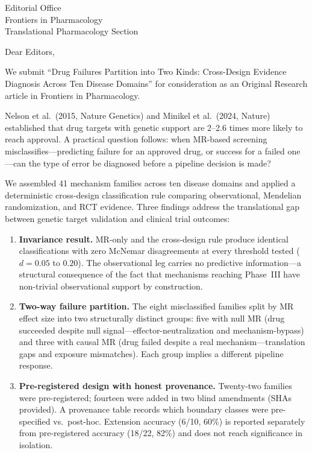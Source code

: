 \documentclass[11pt]{letter}
\date{\today}
\begin{document}
\begin{letter}{Editorial Office \\ Frontiers in Pharmacology \\ Translational Pharmacology Section}

\opening{Dear Editors,}

We submit ``Drug Failures Partition into Two Kinds: Cross-Design Evidence Diagnosis Across Ten Disease Domains'' for consideration as an Original Research article in Frontiers in Pharmacology.

Nelson et al.\ (2015, Nature Genetics) and Minikel et al.\ (2024, Nature) established that drug targets with genetic support are 2--2.6 times more likely to reach approval. A practical question follows: when MR-based screening misclassifies---predicting failure for an approved drug, or success for a failed one---can the type of error be diagnosed before a pipeline decision is made?

We assembled 41 mechanism families across ten disease domains and applied a deterministic cross-design classification rule comparing observational, Mendelian randomization, and RCT evidence. Three findings address the translational gap between genetic target validation and clinical trial outcomes:

\begin{enumerate}
\item \textbf{Invariance result.} MR-only and the cross-design rule produce identical classifications with zero McNemar disagreements at every threshold tested ($d = 0.05$ to $0.20$). The observational leg carries no predictive information---a structural consequence of the fact that mechanisms reaching Phase~III have non-trivial observational support by construction.

\item \textbf{Two-way failure partition.} The eight misclassified families split by MR effect size into two structurally distinct groups: five with null MR (drug succeeded despite null signal---effector-neutralization and mechanism-bypass) and three with causal MR (drug failed despite a real mechanism---translation gaps and exposure mismatches). Each group implies a different pipeline response.

\item \textbf{Pre-registered design with honest provenance.} Twenty-two families were pre-registered; fourteen were added in two blind amendments (SHAs provided). A provenance table records which boundary classes were pre-specified vs.\ post-hoc. Extension accuracy (6/10, 60\%) is reported separately from pre-registered accuracy (18/22, 82\%) and does not reach significance in isolation.
\end{enumerate}


\end{letter}
\end{document}
